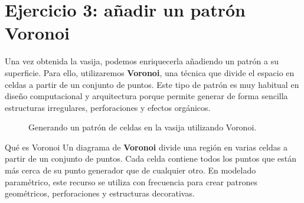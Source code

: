 \documentclass[
  spanish,
  11pt,
  a4paper,
  DIV=11,
  numbers=noendperiod]{scrartcl}
\begin{document}
\section{Ejercicio 3: añadir un patrón Voronoi}
\label{ejercicio-3-anadir-un-patron-voronoi}

Una vez obtenida la vasija, podemos enriquecerla añadiendo un patrón a su superficie. Para ello, utilizaremos \textbf{Voronoi}, una técnica que divide el espacio en celdas a partir de un conjunto de puntos. Este tipo de patrón es muy habitual en diseño computacional y arquitectura porque permite generar de forma sencilla estructuras irregulares, perforaciones y efectos orgánicos.

\begin{figure}[H]
\caption{Generando un patrón de celdas en la vasija utilizando Voronoi.}\label{fig-voronoi}
\end{figure}

\begin{PracticeNoteBox}{Qué es Voronoi}
Un diagrama de \textbf{Voronoi} divide una región en varias celdas a partir de un conjunto de puntos. Cada celda contiene todos los puntos que están más cerca de su punto generador que de cualquier otro. En modelado paramétrico, este recurso se utiliza con frecuencia para crear patrones geométricos, perforaciones y estructuras decorativas.
\end{PracticeNoteBox}
\end{document}
